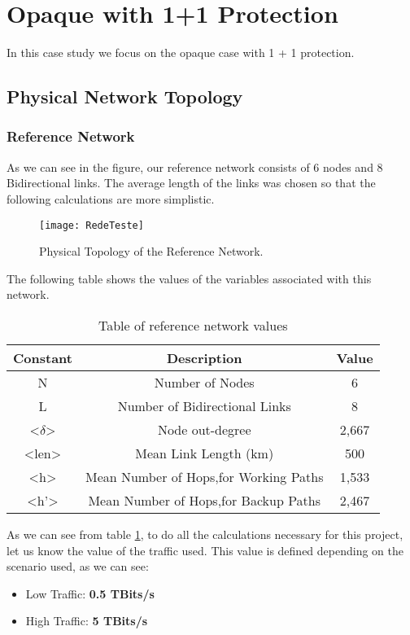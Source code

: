 \clearpage

\section{Opaque with 1+1 Protection}
In this case study we focus on the opaque case with 1 + 1 protection.

\subsection{Physical Network Topology}

\subsubsection{Reference Network}
As we can see in the figure, our reference network consists of 6 nodes and 8 Bidirectional links.
The average length of the links was chosen so that the following calculations are more simplistic.

\begin{figure}[h!]
\centering
\texttt{[image: RedeTeste]}
\caption{Physical Topology of the Reference Network.}
\end{figure}


The following table shows the values of the variables associated with this network.
\begin{table}[h!]
\centering
\begin{tabular}{|| c | c | c||}
 \hline
 Constant & Description & Value \\
 \hline\hline
 N & Number of Nodes & 6 \\
 L & Number of Bidirectional Links & 8 \\
 <$\delta$> & Node out-degree & 2,667 \\
 <len> & Mean Link Length (km) & 500 \\
 <h> & Mean Number of Hops,for Working Paths & 1,533 \\
 <h'> & Mean Number of Hops,for Backup Paths & 2,467 \\
 \hline
\end{tabular}
\caption{Table of reference network values}
\label{table:1}
\end{table}

As we can see from table \ref{table:1}, to do all the calculations necessary for this project, let us know the value of the traffic used. This value is defined depending on the scenario used, as we can see:
\begin{itemize}
  \item Low Traffic: \textbf{0.5 TBits/s}
  \item High Traffic: \textbf{5 TBits/s}
\end{itemize}

